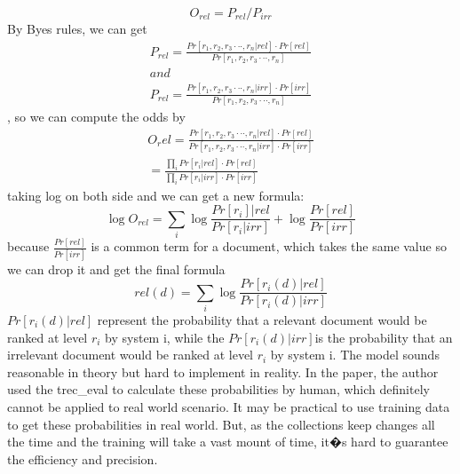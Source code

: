 \begin{equation} 
\label{eq:odds_rel}
	O_{rel}=P_{rel}/P_{irr} 
\end{equation} 
By Byes rules, we can get 
\begin{equation} 
	\begin{split}
		P_{rel}=\frac{Pr[r_1,r_2,r_3\cdotp\cdotp\cdotp,r_n|rel]\cdotp{Pr[rel]}}{Pr[r_1,r_2,r_3\cdotp\cdotp\cdotp,r_n]}
	\\ and\\
		P_{rel}=\frac{Pr[r_1,r_2,r_3\cdotp\cdotp\cdotp,r_n|irr]\cdotp{Pr[irr]}}{Pr[r_1,r_2,r_3\cdotp\cdotp\cdotp,r_n]}
	\end{split}
 \end{equation} , 
 so we can compute the odds by
\begin{equation}
	\begin{split}
		O_rel=\frac{Pr[r_1,r_2,r_3\cdotp\cdotp\cdotp,r_n|rel]\cdotp{Pr[rel]}}{Pr[r_1,r_2,r_3\cdotp\cdotp\cdotp,r_n|irr]\cdotp{Pr[irr]}}\\
			=\frac{\prod_iPr[r_i|rel]\cdotp{Pr[rel]}}{\prod_iPr[r_i|irr]\cdotp{Pr[irr]}}
	\end{split} 
\end{equation} 
taking log on both side and we can get a new formula:
\begin{equation}
	\log{O_{rel}}=\sum\limits_{i}\log{\frac{Pr[r_i]|rel}{Pr[r_i|irr]}}+\log{\frac{Pr[rel]}{Pr[irr]}}
\end{equation} 
because $\frac{Pr[rel]}{Pr[irr]}$ is a common term for a document, which takes the same value so we can drop it and get the final formula 
\begin{equation}
	 rel(d)=\sum\limits_i{\log\frac{Pr[r_i(d)|rel]}{Pr[r_i(d)|irr]}}
\end{equation} $Pr[r_i(d)|rel]$ represent the probability that a relevant document would be ranked at level $r_i$ by system i, while the $Pr[r_i(d)|irr]$is the probability that an irrelevant document would be ranked at level $r_i$ by system i. The model sounds reasonable in theory but hard to implement in reality. In the paper, the author used the trec\_eval to calculate these probabilities by human, which definitely cannot be applied to real world scenario. It may be practical to use training data to get these probabilities in real world. But, as the collections keep changes all the time and the training will take a vast mount of time, it�s hard to guarantee the efficiency and precision. 

